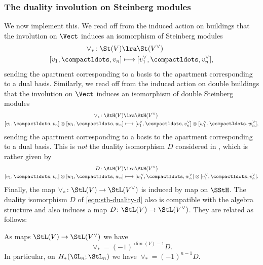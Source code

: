 \documentclass[a4paper]{amsart}
\begin{document}
\subsubsection{The duality involution on Steinberg modules} We now implement this. We read off from the induced action on buildings that the involution on $\Vect$ induces an isomorphism of Steinberg modules
\begin{align*} \vee_* \colon \St(V) &\lra \St(V^\vee) \\
[v_1,\compactldots,v_n] &\longmapsto [v_1^\vee,\compactldots,v_n^\vee],\end{align*}
sending the apartment corresponding to a basis to the apartment corresponding to a dual basis. Similarly, we read off from the induced action on double buildings that the involution on $\Vect$ induces an isomorphism of double Steinberg modules
\begin{equation}\label{eqn:sth-duality-vee}\begin{aligned}\vee_* \colon \StH(V) &\lra \StH(V^\vee) \\
[v_1,\compactldots,v_n] \otimes [w_1,\compactldots,w_n] &\longmapsto [v_1^\vee,\compactldots,v_n^\vee] \otimes [w_1^\vee,\compactldots,w_n^\vee],\end{aligned}\end{equation}
sending the apartment corresponding to a basis to the apartment corresponding to a dual basis. This is \emph{not} the duality isomorphism $D$ considered in \cite[(30)]{CharltonRadchenkoRudenko}, which is rather given by
\begin{equation}\label{eqn:sth-duality-d} \begin{aligned} D \colon \StH(V) &\lra \StH(V^\vee) \\
[v_1,\compactldots,v_n] \otimes [w_1,\compactldots,w_n] &\longmapsto [w_1^\vee,\compactldots,w_n^\vee] \otimes [v_1^\vee,\compactldots,v_n^\vee].\end{aligned}\end{equation} 
Finally, the map $\vee_* \colon \StL(V) \to \StL(V^\vee)$ is induced by map on $\SStH$. The duality isomorphism $D$ of \eqref{eqn:sth-duality-d} also is compatible with the algebra structure and also induces a map $D \colon \StL(V) \to \StL(V^\vee)$. They are related as follows:

\begin{lemma}\label{lem:duality-on-stl-sign} As maps $\StL(V) \to \StL(V^\vee)$ we have
\[\vee_* = (-1)^{\dim(V)-1} D.\]
In particular, on $H_*(\GL_n;\StL_n)$ we have $\vee_* = (-1)^{n-1} D$.
\end{lemma}
\end{document}
